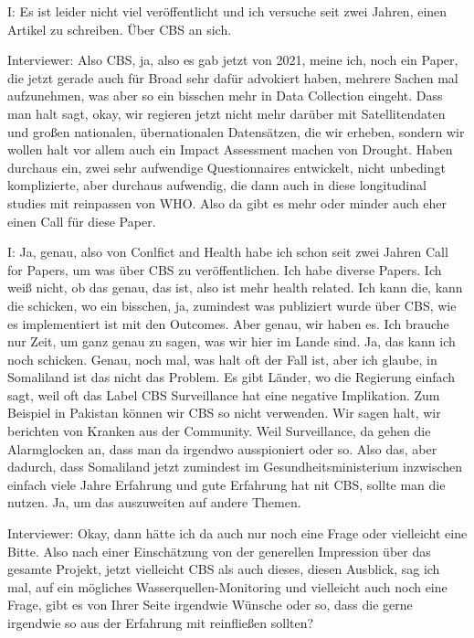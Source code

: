 I: Es ist leider nicht viel veröffentlicht und ich versuche seit zwei Jahren, einen Artikel zu schreiben. Über CBS an sich.

Interviewer: Also CBS, ja, also es gab jetzt von 2021, meine ich, noch ein Paper, die jetzt gerade auch für Broad sehr dafür advokiert haben, mehrere Sachen mal aufzunehmen, was aber so ein bisschen mehr in Data Collection eingeht. Dass man halt sagt, okay, wir regieren jetzt nicht mehr darüber mit Satellitendaten und großen nationalen, übernationalen Datensätzen, die wir erheben, sondern wir wollen halt vor allem auch ein Impact Assessment machen von Drought. Haben durchaus ein, zwei sehr aufwendige Questionnaires entwickelt, nicht unbedingt komplizierte, aber durchaus aufwendig, die dann auch in diese longitudinal studies mit reinpassen von WHO. Also da gibt es mehr oder minder auch eher einen Call für diese Paper. 

I: Ja, genau, also von Conlfict and Health habe ich schon seit zwei Jahren Call for Papers, um was über CBS zu veröffentlichen. Ich habe diverse Papers. Ich weiß nicht, ob das genau, das ist, also ist mehr health related. Ich kann die, kann die schicken, wo ein bisschen, ja, zumindest was publiziert wurde über CBS, wie es implementiert ist mit den Outcomes. Aber genau, wir haben es. Ich brauche nur Zeit, um ganz genau zu sagen, was wir hier im Lande sind. Ja, das kann ich noch schicken. Genau, noch mal, was halt oft der Fall ist, aber ich glaube, in Somaliland ist das nicht das Problem. Es gibt Länder, wo die Regierung einfach sagt, weil oft das Label CBS Surveillance hat eine negative Implikation. Zum Beispiel in Pakistan können wir CBS so nicht verwenden. Wir sagen halt, wir berichten von Kranken aus der Community. Weil Surveillance, da gehen die Alarmglocken an, dass man da irgendwo ausspioniert oder so. Also das, aber dadurch, dass Somaliland jetzt zumindest im Gesundheitsministerium inzwischen einfach viele Jahre Erfahrung und gute Erfahrung hat nit CBS, sollte man die nutzen. Ja, um das auszuweiten auf andere Themen. 

Interviewer: Okay, dann hätte ich da auch nur noch eine Frage oder vielleicht eine Bitte. Also nach einer Einschätzung von der generellen Impression über das gesamte Projekt, jetzt vielleicht CBS als auch dieses, diesen Ausblick, sag ich mal, auf ein mögliches Wasserquellen-Monitoring und vielleicht auch noch eine Frage, gibt es von Ihrer Seite irgendwie Wünsche oder so, dass die gerne irgendwie so aus der Erfahrung mit reinfließen sollten?

